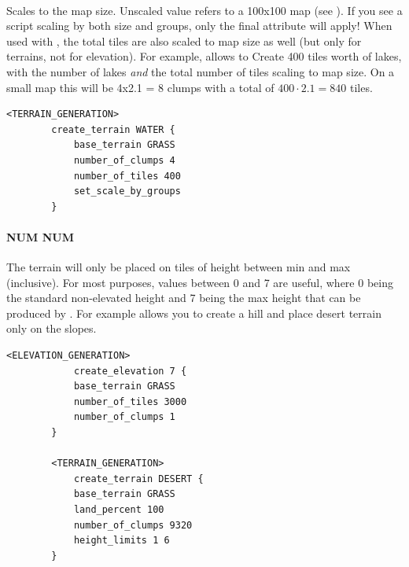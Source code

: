 \begin{appendices}
    \paragraph{}

    Scales  to the map size. Unscaled value refers to a 100x100 map (see ). If you see a script scaling by both size and groups, only the final attribute will apply! When used with , the total tiles are also scaled to map size as well (but only for terrains, not for elevation). For example,  allows to  Create 400 tiles worth of lakes, with the number of lakes \textit{and} the total number of tiles scaling to map size. On a small map this will be 4x2.1 = 8 clumps with a total of $400 \cdot 2.1 = 840$ tiles.

    \begin{lstlisting}[language={rms},label={lst:setscalebygroups}]
        <TERRAIN_GENERATION>
        create_terrain WATER {
            base_terrain GRASS
            number_of_clumps 4
            number_of_tiles 400
            set_scale_by_groups
        }
    \end{lstlisting}

    \paragraph{}

    \paragraph{ NUM NUM}

    The terrain will only be placed on tiles of height between min and max (inclusive). For most purposes, values between 0 and 7 are useful, where 0 being the standard non-elevated height and 7 being the max height that can be produced by . For example  allows you to create a hill and place desert terrain only on the slopes.

    \begin{lstlisting}[language={rms},label={lst:heightslimits}]
        <ELEVATION_GENERATION>
            create_elevation 7 {
            base_terrain GRASS
            number_of_tiles 3000
            number_of_clumps 1
        }

        <TERRAIN_GENERATION>
            create_terrain DESERT {
            base_terrain GRASS
            land_percent 100
            number_of_clumps 9320
            height_limits 1 6
        }
    \end{lstlisting}


\end{appendices}
